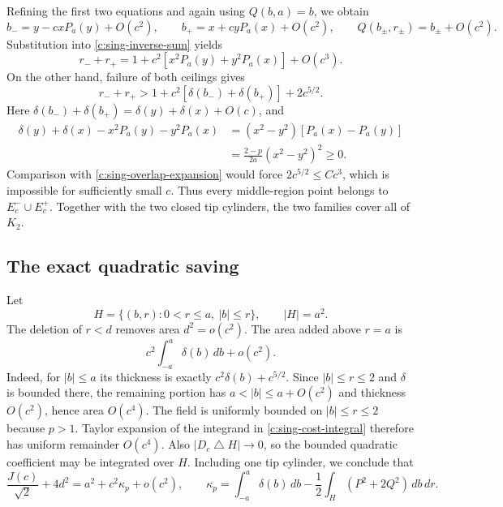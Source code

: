 Refining the first two equations and again using $Q(b,a)=b$, we obtain
\[
 b_-=y-cxP_a(y)+O(c^2),\qquad
 b_+=x+cyP_a(x)+O(c^2),\qquad
 Q(b_\pm,r_\pm)=b_\pm+O(c^2).
\]
Substitution into \eqref{c:sing-inverse-sum} yields
\begin{equation}
 r_-+r_+
   =1+c^2\left[x^2P_a(y)+y^2P_a(x)\right]+O(c^3).
 \label{c:sing-overlap-expansion}
\end{equation}
On the other hand, failure of both ceilings gives
\[
 r_-+r_+>
  1+c^2\left[\delta(b_-)+\delta(b_+)\right]+2c^{5/2}.
\]
Here $\delta(b_-)+\delta(b_+)=\delta(y)+\delta(x)+O(c)$, and
\begin{align*}
 \delta(y)+\delta(x)-x^2P_a(y)-y^2P_a(x)
  &=(x^2-y^2)\left[P_a(x)-P_a(y)\right]\\
  &=\frac{2-p}{2a}(x^2-y^2)^2\ge0.
\end{align*}
Comparison with \eqref{c:sing-overlap-expansion} would force
$2c^{5/2}\le Cc^3$, which is impossible for sufficiently small $c$.
Thus every middle-region point belongs to $E_c^-\cup E_c^+$.
Together with the two closed tip cylinders, the two families cover
all of $K_2$.

\subsection{The exact quadratic saving}

Let
\[
 H=\{(b,r):0<r\le a,\ |b|\le r\},\qquad |H|=a^2.
\]
The deletion of $r<d$ removes area $d^2=o(c^2)$.  The area added
above $r=a$ is
\[
 c^2\int_{-a}^{a}\delta(b)\,db+o(c^2).
\]
Indeed, for $|b|\le a$ its thickness is exactly
$c^2\delta(b)+c^{5/2}$.  Since $|b|\le r\le2$ and $\delta$ is
bounded there, the remaining portion has $a<|b|\le a+O(c^2)$
and thickness $O(c^2)$, hence area $O(c^4)$.
The field is uniformly bounded on $|b|\le r\le2$ because $p>1$.
Taylor expansion of the integrand in
\eqref{c:sing-cost-integral} therefore has uniform remainder
$O(c^4)$.  Also $|D_c\mathbin{\triangle}H|\to0$, so the bounded
quadratic coefficient may be integrated over $H$.  Including one
tip cylinder, we conclude that
\begin{equation}
 \frac{J(c)}{\sqrt{2}}+4d^2
  =a^2+c^2\kappa_p+o(c^2),\qquad
 \kappa_p=\int_{-a}^a\delta(b)\,db
                -\frac12\int_H(P^2+2Q^2)\,db\,dr.
 \label{c:sing-area-expansion}
\end{equation}

